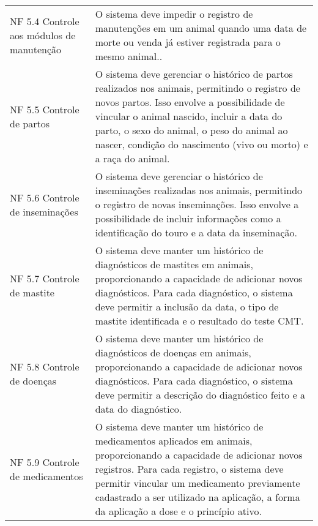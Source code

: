 \begin{tabframed}[!htb]
\begin{tabular}{|l|l|}
    \multicolumn{1}{|p{3cm}|}{\raggedright NF 5.4 Controle aos módulos de manutenção} &
    \multicolumn{1}{|p{12cm}|}{\raggedright O sistema deve impedir o registro de manutenções em um animal quando uma data de morte ou venda já estiver registrada para o mesmo animal..}
    \\ \cline{1-2}

    \multicolumn{1}{|p{3cm}|}{\raggedright NF 5.5 Controle de partos} &
    \multicolumn{1}{|p{12cm}|}{\raggedright O sistema deve gerenciar o histórico de partos realizados nos animais, permitindo o registro de novos partos. Isso envolve a possibilidade de vincular o animal nascido, incluir a data do parto, o sexo do animal, o peso do animal ao nascer, condição do nascimento (vivo ou morto) e a raça do animal.}
    \\ \cline{1-2}

    \multicolumn{1}{|p{3cm}|}{\raggedright NF 5.6 Controle de inseminações} &
    \multicolumn{1}{|p{12cm}|}{\raggedright O sistema deve gerenciar o histórico de inseminações realizadas nos animais, permitindo o registro de novas inseminações. Isso envolve a possibilidade de incluir informações como a identificação do touro e a data da inseminação.}
    \\ \cline{1-2}

    \multicolumn{1}{|p{3cm}|}{\raggedright NF 5.7 Controle de mastite} &
    \multicolumn{1}{|p{12cm}|}{\raggedright O sistema deve manter um histórico de diagnósticos de mastites em animais, proporcionando a capacidade de adicionar novos diagnósticos. Para cada diagnóstico, o sistema deve permitir a inclusão da data, o tipo de mastite identificada e o resultado do teste CMT.}
    \\ \cline{1-2}

    \multicolumn{1}{|p{3cm}|}{\raggedright NF 5.8 Controle de doenças} &
    \multicolumn{1}{|p{12cm}|}{\raggedright O sistema deve manter um histórico de diagnósticos de doenças em animais, proporcionando a capacidade de adicionar novos diagnósticos. Para cada diagnóstico, o sistema deve permitir a descrição do diagnóstico feito e a data do diagnóstico.}
    \\ \cline{1-2}

    \multicolumn{1}{|p{3cm}|}{\raggedright NF 5.9 Controle de medicamentos} &
    \multicolumn{1}{|p{12cm}|}{\raggedright O sistema deve manter um histórico de medicamentos aplicados em animais, proporcionando a capacidade de adicionar novos registros. Para cada registro, o sistema deve permitir vincular um medicamento previamente cadastrado a ser utilizado na aplicação, a forma da aplicação a dose e o princípio ativo.}
    \\ \cline{1-2}

    
  \end{tabular}
  \fonte{} %
\end{tabframed}

